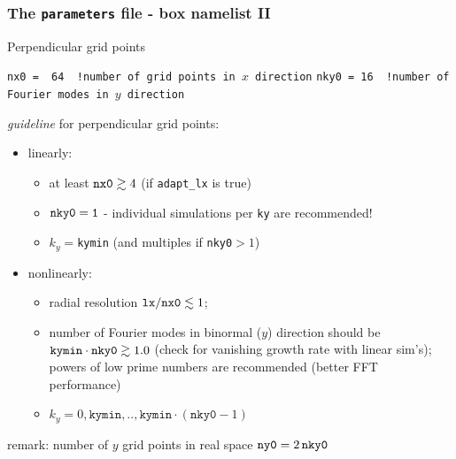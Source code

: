 \documentclass[10pt]{beamer}
\begin{document}
\begin{frame}[fragile]
  \frametitle{The {\tt parameters} file - box namelist II}
\begin{block}{Perpendicular grid points}

\begin{block}

\verb|nx0 =  64  !number of grid points in |$x$\verb| direction|
\verb|nky0 = 16  !number of Fourier modes in |$y$\verb| direction|
\end{block}
{\em guideline} for perpendicular grid points:
\begin{itemize}
\item linearly: 
\begin{itemize}
\item at least ${\tt nx0}\gtrsim 4$ (if {\tt adapt\_lx} is true)
\item ${\tt nky0 = 1}$ - individual simulations per {\tt ky} are recommended!
\item $k_y = ${\tt kymin} (and multiples if {\tt nky0}$>1$)
\end{itemize}
\item nonlinearly:
\begin{itemize}
\item radial resolution ${\tt lx}/{\tt nx0}\lesssim 1$;
\item number of Fourier modes in binormal ($y$) direction should be
${\tt kymin}\cdot {\tt nky0}\gtrsim 1.0$ (check for vanishing growth rate with linear sim's);\\
powers of low prime numbers are recommended (better FFT performance)
\item $k_y=0,\texttt{kymin},..,\texttt{kymin}\cdot\left(\texttt{nky0}-1\right)$
\end{itemize}
\end{itemize}
remark: number of $y$ grid points in real space ${\tt ny0}=2\,{\tt nky0}$
\end{block}


\end{frame}

\end{document}
